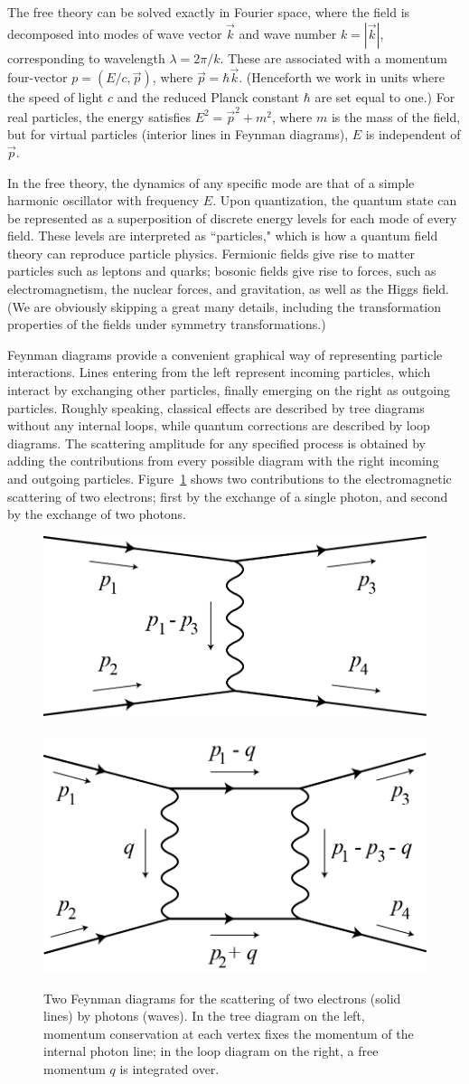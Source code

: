 \documentclass[12pt,letterpaper]{article}
\begin{document}
The free theory can be solved exactly in Fourier space, where the field is decomposed into modes of wave vector $\vec k$ and wave number $k=|\vec k|$, corresponding to wavelength $\lambda = 2\pi/k$.
These are associated with a momentum four-vector $p = (E/c,\vec p)$, where $\vec p = \hbar \vec k$.
(Henceforth we work in units where the speed of light $c$ and the reduced Planck constant $\hbar$ are set equal to one.)
For real particles, the energy satisfies $E^2={{\vec p}^2 + m^2}$, where $m$ is the mass of the field, but for virtual particles (interior lines in Feynman diagrams), $E$ is independent of ${\vec p}$.

In the free theory, the dynamics of any specific mode are that of a simple harmonic oscillator with frequency $E$.
Upon quantization, the quantum state can be represented as a superposition of discrete energy levels for each mode of every field.
These levels are interpreted as ``particles," which is how a quantum field theory can reproduce particle physics.
Fermionic fields give rise to matter particles such as leptons and quarks; bosonic fields give rise to forces, such as electromagnetism, the nuclear forces, and gravitation, as well as the Higgs field.
(We are obviously skipping a great many details, including the transformation properties of the fields under symmetry transformations.)

Feynman diagrams provide a convenient graphical way of representing particle interactions.
Lines entering from the left represent incoming particles, which interact by exchanging other particles, finally emerging on the right as outgoing particles.
Roughly speaking, classical effects are described by tree diagrams without any internal loops, while quantum corrections are described by loop diagrams.
The scattering amplitude for any specified process is obtained by adding the contributions from every possible diagram with the right incoming and outgoing particles.
Figure~\ref{fig:feynman} shows two contributions to the electromagnetic scattering of two electrons; first by the exchange of a single photon, and second by the exchange of two photons.

\begin{figure}[h]
\centering
\includegraphics[width=.3\textwidth, valign=c]{electron-scatter-momentum-1.png}~~~~~~~~~
\includegraphics[width=.3\textwidth, valign=c]{electron-scatter-momentum-2.png}
\caption{\small Two Feynman diagrams for the scattering of two electrons (solid lines) by photons (waves).
In the tree diagram on the left, momentum conservation at each vertex fixes the momentum of the internal photon line; in the loop diagram on the right, a free momentum $q$ is integrated over.}
\label{fig:feynman}
\end{figure}
\end{document}
